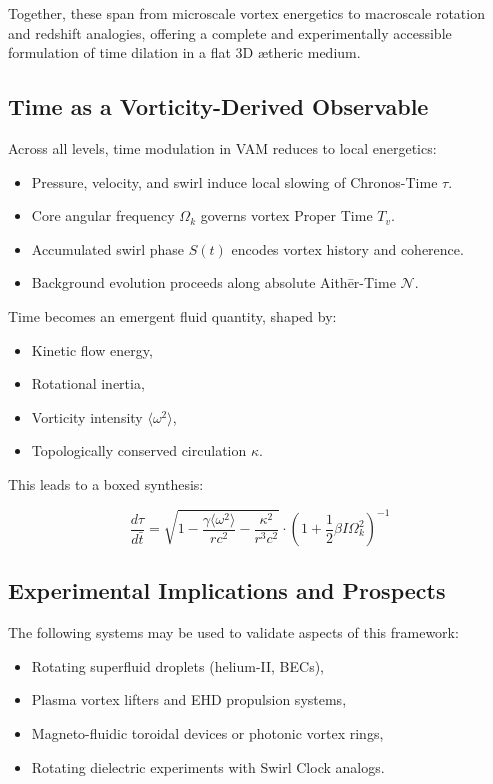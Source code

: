Together, these span from microscale vortex energetics to macroscale rotation and redshift analogies, offering a complete and experimentally accessible formulation of time dilation in a flat 3D ætheric medium.

\subsection{Time as a Vorticity-Derived Observable}

Across all levels, time modulation in VAM reduces to local energetics:
\begin{itemize}
    \item Pressure, velocity, and swirl induce local slowing of Chronos-Time \( \tau \).
    \item Core angular frequency \( \Omega_k \) governs vortex Proper Time \( T_v \).
    \item Accumulated swirl phase \( S(t) \) encodes vortex history and coherence.
    \item Background evolution proceeds along absolute Aithēr-Time \( \mathcal{N} \).
\end{itemize}

Time becomes an emergent fluid quantity, shaped by:
\begin{itemize}
    \item Kinetic flow energy,
    \item Rotational inertia,
    \item Vorticity intensity \( \langle \omega^2 \rangle \),
    \item Topologically conserved circulation \( \kappa \).
\end{itemize}

This leads to a boxed synthesis:

\begin{equation}
\boxed{
\frac{d\tau}{d\bar{t}} =
\sqrt{1 - \frac{\gamma \langle \omega^2 \rangle}{r c^2} - \frac{\kappa^2}{r^3 c^2}} \cdot
\left(1 + \frac{1}{2} \beta I \Omega_k^2 \right)^{-1}
}
\label{eq:VAM_final_time_dilation}
\end{equation}

\subsection{Experimental Implications and Prospects}

The following systems may be used to validate aspects of this framework:
\begin{itemize}
    \item Rotating superfluid droplets (helium-II, BECs),
    \item Plasma vortex lifters and EHD propulsion systems,
    \item Magneto-fluidic toroidal devices or photonic vortex rings,
    \item Rotating dielectric experiments with Swirl Clock analogs.
\end{itemize}

